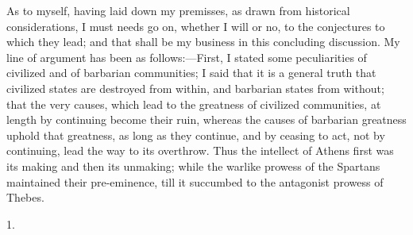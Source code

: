 As to myself, having laid down
my premisses, as drawn from historical considerations, I must needs go
on, whether I will or no, to the conjectures to which they lead; and
that shall be my business in this concluding discussion. My line of
argument has been as follows:—First, I stated some peculiarities of
civilized and of barbarian communities; I said that it is a general
truth that civilized states are destroyed from within, and barbarian
states from without; that the very causes, which lead to the greatness
of civilized communities, at length by continuing become their ruin, whereas the causes of barbarian greatness uphold that greatness,
as long as they continue, and by ceasing to act, not by continuing,
lead the way to its overthrow. Thus the intellect of Athens first was
its making and then its unmaking; while the warlike prowess of the
Spartans maintained their pre-eminence, till it succumbed to the
antagonist prowess of Thebes.

1.

